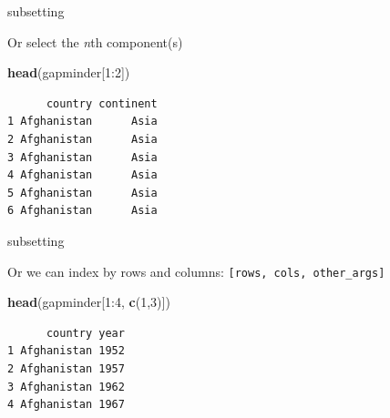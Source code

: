 \documentclass[10pt,ignorenonframetext,compress, aspectratio=169]{beamer}
\newenvironment{Shaded}{\begin{snugshade}}{\end{snugshade}}
\newcommand{\KeywordTok}[1]{\textcolor[rgb]{0.13,0.29,0.53}{\textbf{{#1}}}}
\newcommand{\DecValTok}[1]{\textcolor[rgb]{0.00,0.00,0.81}{{#1}}}
\newcommand{\NormalTok}[1]{{#1}}
\begin{document}
\begin{frame}[fragile]{subsetting}

Or select the \emph{n}th component(s)

\scriptsize

\begin{Shaded}
\begin{Highlighting}[]
\KeywordTok{head}\NormalTok{(gapminder[}\DecValTok{1}\NormalTok{:}\DecValTok{2}\NormalTok{])}
\end{Highlighting}
\end{Shaded}

\begin{verbatim}
      country continent
1 Afghanistan      Asia
2 Afghanistan      Asia
3 Afghanistan      Asia
4 Afghanistan      Asia
5 Afghanistan      Asia
6 Afghanistan      Asia
\end{verbatim}

\normalsize

\end{frame}

\begin{frame}[fragile]{subsetting}

Or we can index by rows and columns:
\texttt{{[}rows, cols, other\_args{]}}

\scriptsize

\begin{Shaded}
\begin{Highlighting}[]
\KeywordTok{head}\NormalTok{(gapminder[}\DecValTok{1}\NormalTok{:}\DecValTok{4}\NormalTok{, }\KeywordTok{c}\NormalTok{(}\DecValTok{1}\NormalTok{,}\DecValTok{3}\NormalTok{)])}
\end{Highlighting}
\end{Shaded}

\begin{verbatim}
      country year
1 Afghanistan 1952
2 Afghanistan 1957
3 Afghanistan 1962
4 Afghanistan 1967
\end{verbatim}

\normalsize

\end{frame}
\end{document}
